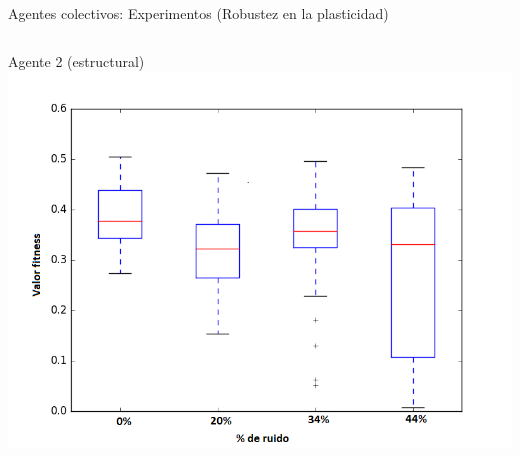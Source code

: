 \documentclass[aspectratio=169]{beamer}
\begin{document}
\begin{frame}{Agentes colectivos: Experimentos (Robustez en la plasticidad)}
\begin{itemize}
\begin{columns}
\begin{column}{0.5\textwidth}
\begin{block}{Agente 2 (estructural)}
        \includegraphics[width=1.0\textwidth,height=.6\textheight]{Imagenes/BoxPlotNP2}
        \end{block}
      \end{column}
    \end{columns}
  \end{itemize}
\end{frame}
\end{document}
